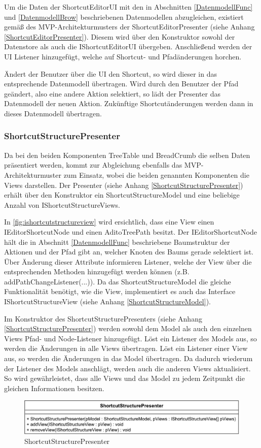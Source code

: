 Um die Daten der ShortcutEditorUI mit den in Abschnitten \ref{DatenmodellFunc} und \ref{DatenmodellBrow} beschriebenen Datenmodellen abzugleichen, existiert gemäß des MVP-Architekturmusters der ShortcutEditorPresenter (siehe Anhang \ref{ShortcutEditorPresenter}). Diesem wird über den Konstruktor sowohl der Datenstore als auch die IShortcutEditorUI übergeben. Anschließend werden der UI Listener hinzugefügt, welche auf Shortcut- und Pfadänderungen horchen.

Ändert der Benutzer über die UI den Shortcut, so wird dieser in das entsprechende Datenmodell übertragen. Wird durch den Benutzer der Pfad geändert, also eine andere Aktion selektiert, so lädt der Presenter das Datenmodell der neuen Aktion. Zukünftige Shortcutänderungen werden dann in dieses Datenmodell übertragen.

\subsubsection{ShortcutStructurePresenter}

Da bei den beiden Komponenten TreeTable und BreadCrumb die selben Daten präsentiert werden, kommt zur Abgleichung ebenfalls das MVP-Architekturmuster zum Einsatz, wobei die beiden genannten Komponenten die Views darstellen. Der Presenter (siehe Anhang \ref{ShortcutStructurePresenter}) erhält über den Konstruktor ein ShortcutStructureModel und eine beliebige Anzahl von IShortcutStructureViews. 

In \autoref{fig:ishortcutstructureview} wird ersichtlich, dass eine View einen IEditorShortcutNode und einen AditoTreePath besitzt. Der IEditorShortcutNode hält die in Abschnitt \ref{DatenmodellFunc} beschriebene Baumstruktur der Aktionen und der Pfad gibt an, welcher Knoten des Baums gerade selektiert ist. Über Änderung dieser Attribute informieren Listener, welche der View über die entsprechenden Methoden hinzugefügt werden können (z.B. addPathChangeListener(...)). Da das ShortcutStructureModel die gleiche Funktionalität benötigt, wie die View, implementiert es auch das Interface IShortcutStructureView (siehe Anhang \ref{ShortcutStructureModel}).

Im Konstruktor des ShortcutStructurePresenters (siehe Anhang \ref{ShortcutStructurePresenter}) werden sowohl dem Model als auch den einzelnen Views Pfad- und Node-Listener hinzugefügt. Löst ein Listener des Models aus, so werden die Änderungen in alle Views übertragen. Löst ein Listener einer View aus, so werden die Änderungen in das Model übertragen. Da dadurch wiederum der Listener des Models anschlägt, werden auch die anderen Views aktualisiert. So wird gewährleistet, dass alle Views und das Model zu jedem Zeitpunkt die gleichen Informationen besitzen.

\begin{figure}[H]
	\centering
	\includegraphics[width=0.6\linewidth]{../graphic/diagrams/CD_ShortcutStructurePresenter/ShortcutStructurePresenter}
	\caption{ShortcutStructurePresenter}
	\label{fig:shortcutstructurepresenter}
\end{figure}

\newpage